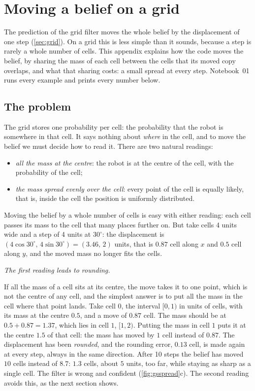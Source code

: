 \chapter{Moving a belief on a grid}
\label{app:gridshift}

The prediction of the grid filter moves the whole belief by the
displacement of one step (\cref{sec:grid}). On a grid this is less simple
than it sounds, because a step is rarely a whole number of cells. This
appendix explains how the code moves the belief, by sharing the mass of
each cell between the cells that its moved copy overlaps, and what that
sharing costs:
a small spread at every step. Notebook~01 runs every example and prints
every number below.

\section{The problem}
\label{sec:gs-problem}

The grid stores one probability per cell: the probability that the
robot is somewhere in that cell. It says nothing about \emph{where} in the
cell, and to move the belief we must decide how to read it. There are two
natural readings:
\begin{itemize}[nosep]
  \item \emph{all the mass at the centre}: the robot is at the centre of
        the cell, with the probability of the cell;
  \item \emph{the mass spread evenly over the cell}: every point of the
        cell is equally likely, that is, inside the cell the position is
        uniformly distributed.
\end{itemize}
Moving the belief by a whole number of cells is easy with either reading:
each cell passes its mass to the cell that many places further on. But
take cells 4 units wide and a step of 4 units at $30^\circ$: the
displacement is $(4\cos30^\circ,\,4\sin30^\circ)=(3.46,\,2)$ units, that
is $0.87$ cell along $x$ and $0.5$ cell along $y$, and the moved mass no
longer fits the cells.

\emph{The first reading leads to rounding.}

If all the mass of a cell sits at its centre, the move takes it to one
point, which is not the centre of any cell, and the simplest answer is to
put all the mass in the cell where that point lands. Take cell $0$, the interval $[0,1)$ in units of cells, with its
mass at the centre $0.5$, and a move of $0.87$ cell. The mass should be at
$0.5+0.87=1.37$, which lies in cell $1$, $[1,2)$. Putting the mass in
cell $1$ puts it at the centre $1.5$ of that cell: the mass has moved by
$1$ cell instead of $0.87$. The displacement has been \emph{rounded}, and
the rounding error, $0.13$ cell, is made again at every step, always in
the same direction. After 10 steps the belief has moved $10$ cells
instead of $8.7$: $1.3$ cells, about $5$ units, too far, while staying as
sharp as a single cell. The filter is wrong and confident
(\cref{fig:gsspread}c). The second reading avoids this, as the next
section shows.


